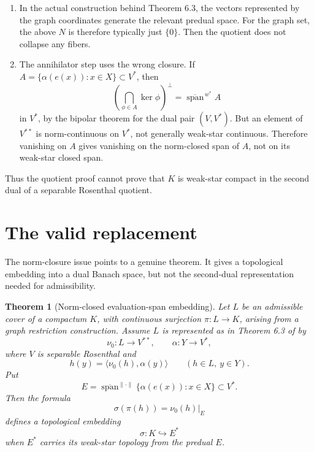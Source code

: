 \documentclass[11pt]{article}
\newtheorem{theorem}{Theorem}[section]
\newcommand{\spancl}{\overline{\operatorname{span}}}
\newcommand{\norm}[1]{\lVert #1\rVert}
\newcommand{\weakstar}{w^*}
\begin{document}
\begin{enumerate}[leftmargin=2em]
\item In the actual construction behind Theorem 6.3, the vectors represented
      by the graph coordinates generate the relevant predual space.  For the
      graph set, the above \(N\) is therefore typically just \(\{0\}\).  Then
      the quotient does not collapse any fibers.
\item The annihilator step uses the wrong closure.  If
      \(A=\{\alpha(e(x)):x\in X\}\subset V^*\), then
      \[
        \left(\bigcap_{\phi\in A}\ker\phi\right)^\perp
        =\overline{\operatorname{span}}^{\,\weakstar} A
      \]
      in \(V^*\), by the bipolar theorem for the dual pair \((V,V^*)\).
      But an element of \(V^{**}\) is norm-continuous on \(V^*\), not
      generally weak-star continuous.  Therefore vanishing on \(A\) gives
      vanishing on the norm-closed span of \(A\), not on its weak-star closed
      span.
\end{enumerate}

Thus the quotient proof cannot prove that \(K\) is weak-star compact in the
second dual of a separable Rosenthal quotient.

\section{The valid replacement}
\label{sec:replacement}

The norm-closure issue points to a genuine theorem.  It gives a topological
embedding into a dual Banach space, but not the second-dual representation
needed for admissibility.

\begin{theorem}[Norm-closed evaluation-span embedding]
\label{thm:embedding}
Let \(L\) be an admissible cover of a compactum \(K\), with continuous
surjection \(\pi:L\to K\), arising from a graph restriction construction.
Assume \(L\) is represented as in Theorem 6.3 of \cite{GM0803} by
\[
   \nu_0:L\to V^{**},\qquad \alpha:Y\to V^*,
\]
where \(V\) is separable Rosenthal and
\[
   h(y)=\langle \nu_0(h),\alpha(y)\rangle
   \qquad(h\in L,\ y\in Y).
\]
Put
\[
   E=\spancl^{\norm{\cdot}}\{\alpha(e(x)):x\in X\}\subset V^* .
\]
Then the formula
\[
   \sigma(\pi(h))=\nu_0(h)|_E
\]
defines a topological embedding
\[
   \sigma:K\hookrightarrow E^*
\]
when \(E^*\) carries its weak-star topology from the predual \(E\).
\end{theorem}
\end{document}
